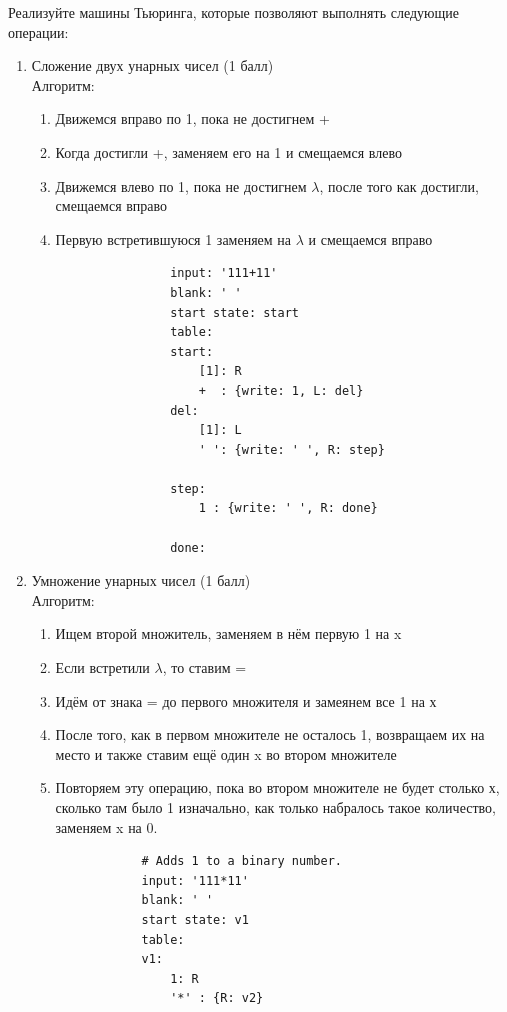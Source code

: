\documentclass{article}
\begin{document}
Реализуйте машины Тьюринга, которые позволяют выполнять следующие операции:
\begin{enumerate}
    \item Сложение двух унарных чисел (1 балл) \\
        Алгоритм:
        \begin{enumerate}
            \item Движемся вправо по 1, пока не достигнем +
            \item Когда достигли +, заменяем его на 1 и смещаемся влево
            \item Движемся влево по 1, пока не достигнем $\lambda$, после того как достигли, смещаемся вправо
            \item Первую встретившуюся 1 заменяем на $\lambda$ и смещаемся вправо
            \begin{lstlisting}
                input: '111+11'
                blank: ' '
                start state: start
                table:
                start:
                    [1]: R
                    +  : {write: 1, L: del}
                del:
                    [1]: L
                    ' ': {write: ' ', R: step}
    
                step:
                    1 : {write: ' ', R: done}
  
                done:
            \end{lstlisting}
        \end{enumerate}
    
    \item Умножение унарных чисел (1 балл) \\
        Алгоритм:
        \begin{enumerate}
            \item Ищем второй множитель, заменяем в нём первую 1 на x
            \item Если встретили $\lambda$, то ставим =
            \item Идём от знака = до первого множителя и замеянем все 1 на х
            \item После того, как в первом множителе не осталось 1, возвращаем их на место и также ставим ещё один x во втором множителе
            \item Повторяем эту операцию, пока во втором множителе не будет столько х, сколько там было 1 изначально, как только набралось такое количество, заменяем x на 0.
            
            \begin{lstlisting}
            # Adds 1 to a binary number.
            input: '111*11'
            blank: ' '
            start state: v1
            table:
            v1:
                1: R
                '*' : {R: v2}
    

\end{lstlisting}
\end{enumerate}
\end{enumerate}
\end{document}
